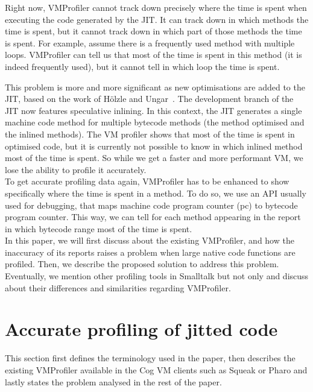 \documentclass[10pt,preprint,nonatbib]{sigplanconf}
\begin{document}
Right now, VMProfiler cannot track down precisely where the time is spent when executing the code generated by the JIT. It can track down in which methods the time is spent, but it cannot track down in which part of those methods the time is spent. For example, assume there is a frequently used method with multiple loops. VMProfiler can tell us that most of the time is spent in this method (it is indeed frequently used), but it cannot tell in which loop the time is spent.

This problem is more and more significant as new optimisations are added to the JIT, based on the work of H\"olzle and Ungar~\cite{Holz94a}. The development branch of the JIT now features speculative inlining. In this context, the JIT generates a single machine code method for multiple bytecode methods (the method optimised and the inlined methods). The VM profiler shows that most of the time is spent in optimised code, but it is currently not possible to know in which inlined method most of the time is spent. So while we get a faster and more performant VM, we lose the ability to profile it accurately.\\

To get accurate profiling data again, VMProfiler has to be enhanced to show specifically where the time is spent in a method. To do so, we use an API usually used for debugging, that maps machine code program counter (pc) to bytecode program counter. This way, we can tell for each method appearing in the report in which bytecode range most of the time is spent.\\

In this paper, we will first discuss about the existing VMProfiler, and how the inaccuracy of its reports raises a problem when large native code functions are profiled. Then, we describe the proposed solution to address this problem. Eventually, we mention other profiling tools in Smalltalk but not only and discuss about their differences and similarities regarding VMProfiler.



\section{Accurate profiling of jitted code}

This section first defines the terminology used in the paper, then describes the existing VMProfiler available in the Cog VM clients such as Squeak or Pharo and lastly states the problem analysed in the rest of the paper.
\end{document}
